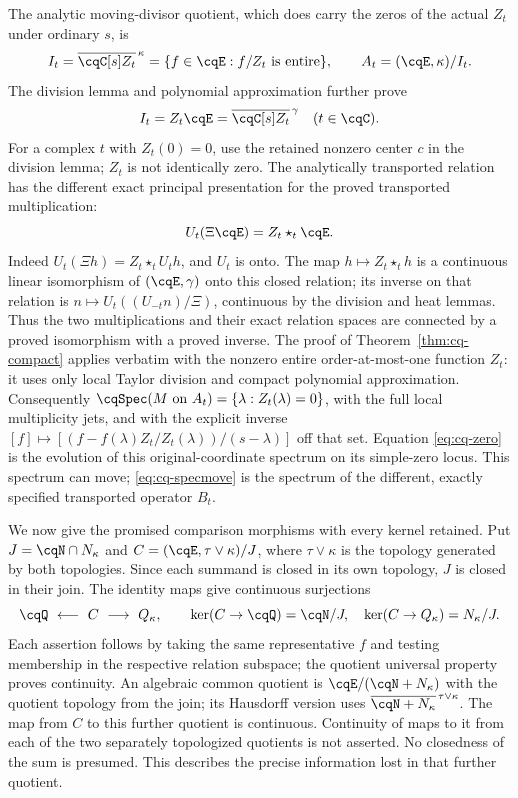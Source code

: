 The analytic moving-divisor quotient, which does carry the zeros of
the actual $Z_t$ under ordinary $s$, is
\begin{equation}\label{eq:cq-divisor}
 I_t=\overline{\cqC[s]Z_t}^{\,\kappa}
 =\{f\in\cqE:f/Z_t\text{ is entire}\},\qquad
 A_t=(\cqE,\kappa)/I_t.
\end{equation}
The division lemma and polynomial approximation further prove
\[
 I_t=Z_t\cqE=\overline{\cqC[s]Z_t}^{\,\gamma}\quad(t\in\cqC).
\]
For a complex $t$ with $Z_t(0)=0$, use the retained nonzero center
$c$ in the division lemma; $Z_t$ is not identically zero.
The analytically transported relation has the different exact
principal presentation for the proved transported multiplication:
\begin{equation}\label{eq:cq-starideal}
 U_t(\Xi\cqE)=Z_t\star_t\cqE.
\end{equation}
Indeed $U_t(\Xi h)=Z_t\star_t U_th$, and $U_t$ is onto.
The map $h\mapsto Z_t\star_t h$ is a continuous linear
isomorphism of $(\cqE,\gamma)$ onto this closed relation;
its inverse on that relation is
$n\mapsto U_t((U_{-t}n)/\Xi)$, continuous by the division and
heat lemmas. Thus the two multiplications and their exact relation
spaces are connected by a proved isomorphism with a proved inverse.
The proof of Theorem~\ref{thm:cq-compact} applies verbatim with
the nonzero entire order-at-most-one function $Z_t$: it uses only
local Taylor division and compact polynomial approximation.
Consequently $\cqSpec(M\text{ on }A_t)=\{\lambda:Z_t(\lambda)=0\}$,
with the full local multiplicity jets, and with the explicit inverse
$[f]\mapsto[(f-f(\lambda)Z_t/Z_t(\lambda))/(s-\lambda)]$
off that set. Equation \eqref{eq:cq-zero} is the evolution of this
original-coordinate spectrum on its simple-zero locus.
This spectrum can move; \eqref{eq:cq-specmove} is the spectrum
of the different, exactly specified transported operator $B_t$.

We now give the promised comparison morphisms with every kernel
retained. Put $J=\cqN\cap N_\kappa$ and
$C=(\cqE,\tau\vee\kappa)/J$, where $\tau\vee\kappa$ is the
topology generated by both topologies. Since each summand is closed
in its own topology, $J$ is closed in their join. The identity maps
give continuous surjections
\begin{equation}\label{eq:cq-span}
 \cqQ\ \longleftarrow\ C\ \longrightarrow\ Q_\kappa,
 \qquad\ker(C\to\cqQ)=\cqN/J,
 \quad\ker(C\to Q_\kappa)=N_\kappa/J.
\end{equation}
Each assertion follows by taking the same representative $f$ and
testing membership in the respective relation subspace; the quotient
universal property proves continuity. An algebraic common quotient is
$\cqE/(\cqN+N_\kappa)$ with the quotient topology from the join;
its Hausdorff version uses
$\overline{\cqN+N_\kappa}^{\,\tau\vee\kappa}$.
The map from $C$ to this further quotient is continuous. Continuity
of maps to it from each of the two separately topologized quotients
is not asserted. No closedness of the sum is presumed. This describes
the precise information lost in that further quotient.

